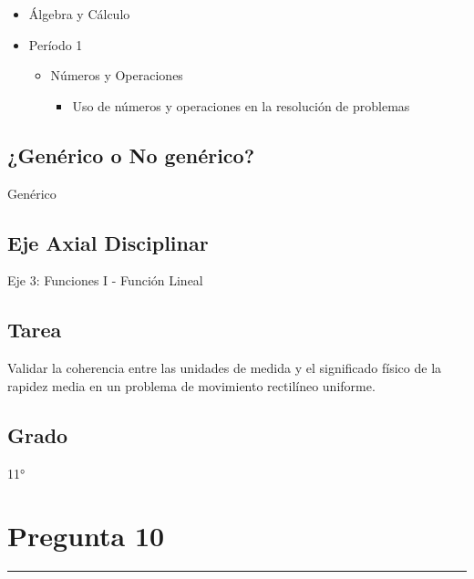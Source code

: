\documentclass[
]{article}
\providecommand{\tightlist}{%
  \setlength{\itemsep}{0pt}\setlength{\parskip}{0pt}}
\begin{document}
\begin{itemize}
\tightlist
\item
  Álgebra y Cálculo
\item
  Período 1

  \begin{itemize}
  \tightlist
  \item
    Números y Operaciones

    \begin{itemize}
    \tightlist
    \item
      Uso de números y operaciones en la resolución de problemas
    \end{itemize}
  \end{itemize}
\end{itemize}

\subsection{¿Genérico o No
genérico?}\label{genuxe9rico-o-no-genuxe9rico-1}

Genérico

\subsection{Eje Axial Disciplinar}\label{eje-axial-disciplinar-2}

Eje 3: Funciones I - Función Lineal

\subsection{Tarea}\label{tarea-2}

Validar la coherencia entre las unidades de medida y el significado
físico de la rapidez media en un problema de movimiento rectilíneo
uniforme.

\subsection{Grado}\label{grado-1}

11°

\section{Pregunta 10}\label{pregunta-10}

\begin{center}\rule{0.5\linewidth}{0.5pt}\end{center}
\end{document}
